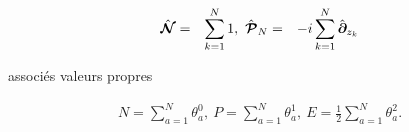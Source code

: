 \begin{eqnarray}
	\hat{\bm{ \mathcal{N}}} & = & \sum_{k = 1}^N 1,~\hat{\bm{ \mathcal{P}}}_N  &=&	- i\sum_{k = 1}^N \hat{\bm{\partial}}_{z_k}	
\end{eqnarray}

associés valeurs propres 

\begin{eqnarray}
	N = \sum_{a = 1}^N \theta_a^0 , ~ P = \sum_{a = 1}^N \theta_a^1 ,~E = \frac{1}{2}\sum_{a = 1}^N \theta_a^2.	
\end{eqnarray}
